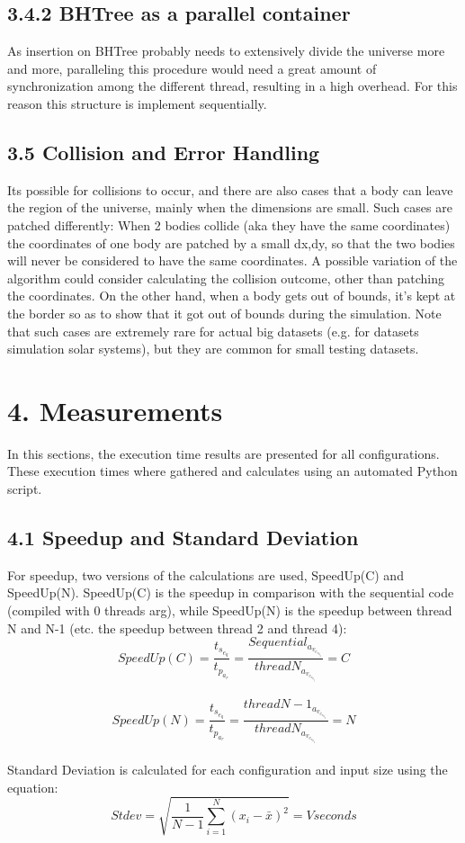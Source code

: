 \documentclass{article}
\begin{document}
\subsection*{3.4.2 BHTree as a parallel container}
As insertion on BHTree probably needs to extensively divide the universe more and more, paralleling this procedure would need a great amount of synchronization among the different thread, resulting in a high overhead. For this reason this structure is implement sequentially.

\subsection*{3.5 Collision and Error Handling}
Its possible for collisions to occur, and there are also cases that a body can leave the region of the universe, mainly when the dimensions are small. Such cases are patched differently:
When 2 bodies collide (aka they have the same coordinates) the coordinates of one body are patched by a small dx,dy, so that the two bodies will never be considered to have the same coordinates. A possible variation of the algorithm could consider calculating the collision outcome, other than patching the coordinates. On the other hand, when a body gets out of bounds, it's kept at the border so as to show that it got out of bounds during the simulation. Note that such cases are extremely rare for actual big datasets (e.g. for datasets simulation solar systems), but they are common for small testing datasets.

\section*{4. Measurements}
In this sections, the execution time results are presented for all configurations. These execution times where gathered and calculates using an automated Python script.

\subsection*{4.1 Speedup and Standard Deviation}
For speedup, two versions of the calculations are used, SpeedUp(C) and SpeedUp(N). SpeedUp(C) is the speedup in comparison with the sequential code (compiled with 0 threads arg), while SpeedUp(N) is the speedup between thread N and N-1 (etc. the speedup between thread 2 and thread 4):
\[SpeedUp(C) = \frac{t_s_e_q}{t_p_a_r} = \frac{Sequential_a_v_e_r_a_g_e}{threadN_a_v_e_r_a_g_e} = C  \]\\
\[SpeedUp(N) = \frac{t_s_e_q}{t_p_a_r} = \frac{threadN-1_a_v_e_r_a_g_e}{threadN_a_v_e_r_a_g_e} = N   \]\\
Standard Deviation is calculated for each configuration and input size using the equation:
\[Stdev=\sqrt{\frac{1}{N-1}\sum_{i=1}^N(x_i-\bar{x})^2}= V seconds\]\\
\end{document}
